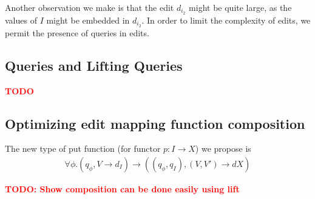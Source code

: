 \documentclass[a4paper,10pt]{article}
\newcommand{\finish}[1]{#1}
\newcommand{\comment}[1]{\finish{\textbf{\textcolor{red}{#1}}}}
\begin{document}
Another observation we make is that the edit $d_{i_2}$ might be quite large, as
the values of $I$ might be embedded in $d_{i_2}$. In order to limit the complexity
of edits, we permit the presence of queries in edits.

\subsection{Queries and Lifting Queries}
\comment{TODO}

\subsection{Optimizing edit mapping function composition}
The new type of put function (for functor $p: I \to X$) we propose is
\begin{align*}
\forall \phi. (q_{\phi}, V \to d_I) \to ((q_{\phi},q_I), (V,V') \to dX) 
\end{align*}

\comment{TODO: Show composition can be done easily using lift} 
\end{document}
